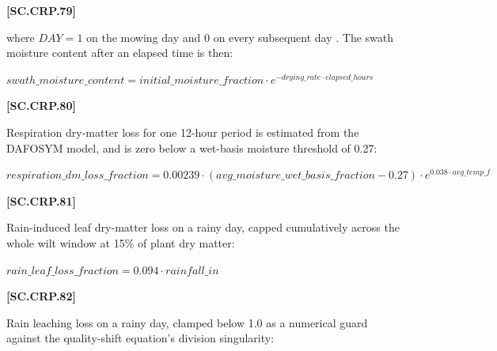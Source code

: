             {\raggedleft \textbf{[SC.CRP.79]}\par}
            \vspace{0.5cm}

where $DAY=1$ on the mowing day and $0$ on every subsequent day \citep{rotzchen1985}. The swath moisture content after an elapsed time is then:
   \vspace{0.2cm}

    \begin{center}
        \(swath\_moisture\_content= initial\_moisture\_fraction \cdot e^{-drying\_rate \cdot elapsed\_hours}\)
    \end{center}
        \vspace{0.5cm}

            {\raggedleft \textbf{[SC.CRP.80]}\par}
            \vspace{0.5cm}

Respiration dry-matter loss for one 12-hour period is estimated from the DAFOSYM model, and is zero below a wet-basis moisture threshold of 0.27:
   \vspace{0.2cm}

    \begin{center}
        \(respiration\_dm\_loss\_fraction= 0.00239 \cdot (avg\_moisture\_wet\_basis\_fraction-0.27) \cdot e^{0.038 \cdot avg\_temp\_f}\)
    \end{center}
        \vspace{0.5cm}

            {\raggedleft \textbf{[SC.CRP.81]}\par}
            \vspace{0.5cm}

Rain-induced leaf dry-matter loss on a rainy day, capped cumulatively across the whole wilt window at 15\% of plant dry matter:
   \vspace{0.2cm}

    \begin{center}
        \(rain\_leaf\_loss\_fraction= 0.094 \cdot rainfall\_in\)
    \end{center}
        \vspace{0.5cm}

            {\raggedleft \textbf{[SC.CRP.82]}\par}
            \vspace{0.5cm}

Rain leaching loss on a rainy day, clamped below 1.0 as a numerical guard against the quality-shift equation's division singularity:
   \vspace{0.2cm}

